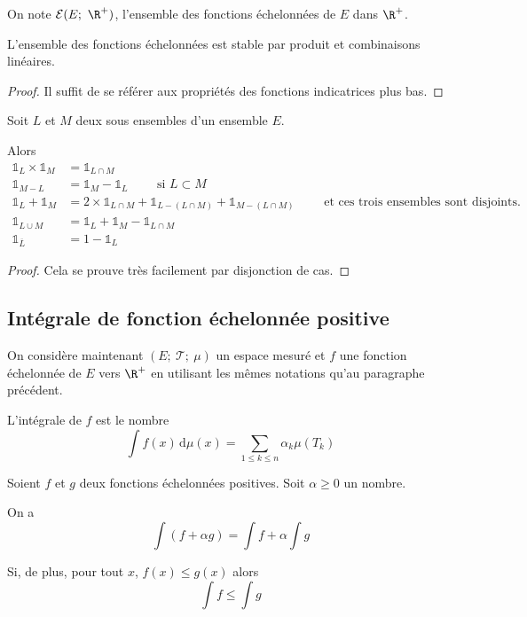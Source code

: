On note $\mathcal{E}(E;~\R^{+})$, l'ensemble des fonctions échelonnées de $E$ dans $\R^{+}$.


\begin{prop}
L'ensemble des fonctions échelonnées est stable par produit et combinaisons linéaires.
\end{prop}

\begin{proof}
Il suffit de se référer aux propriétés des fonctions indicatrices plus bas.
\end{proof}

\begin{prop}
Soit $L$ et $M$ deux sous ensembles d'un ensemble $E$.

Alors
\begin{align*}
\mathbb{1}_L \times \mathbb{1}_M & = \mathbb{1}_{L \cap M} \\
\mathbb{1}_{M-L} & = \mathbb{1}_{M} - \mathbb{1}_{L} \qquad \text{ si }L \subset M \\
\mathbb{1}_L + \mathbb{1}_M & = 2 \times \mathbb{1}_{L \cap M}+\mathbb{1}_{L-\left(L \cap M\right)}+\mathbb{1}_{M-\left(L \cap M\right)} \qquad \text{ et ces trois ensembles sont disjoints.}\\
\mathbb{1}_{L \cup M} & = \mathbb{1}_{L} + \mathbb{1}_{M} - \mathbb{1}_{L \cap M} \\
\mathbb{1}_{\overline{L}} & = 1-\mathbb{1}_{L}
\end{align*}
\end{prop}

\begin{proof}
Cela se prouve très facilement par disjonction de cas.
\end{proof}

\subsection{Intégrale de fonction échelonnée positive}

On considère maintenant $\left(E;~\mathcal{T};~\mathcal{\mu}\right)$ un espace mesuré et $f$ une fonction échelonnée de $E$ vers $\R^{+}$ en utilisant les mêmes notations qu'au paragraphe précédent.

L'intégrale de $f$ est le nombre
\[
\displaystyle{\int} f(x) \, \mathrm d \mu(x) = \displaystyle{\sum \limits_{1 \leq k \leq n}} \alpha_k \mu(T_k) 
\]

\begin{prop}
Soient $f$ et $g$ deux fonctions échelonnées positives. Soit $\alpha \geq 0$ un nombre.

On a 
\[
\int (f + \alpha g) = \int f + \alpha \int g
\]

Si, de plus, pour tout $x$, $f(x) \leq g(x)$ alors
\[
\int f \leq \int g
\]
\end{prop}

